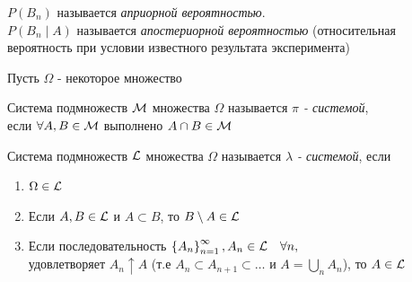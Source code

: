 \begin{definition}
	$P(B_n)$ называется \emph{априорной вероятностью}.\\
	$P(B_n \mid A)$ называется \emph{апостериорной вероятностью} (относительная вероятность при условии известного результата эксперимента)
\end{definition}


Пусть $\Omega$ - некоторое множество

\begin{definition}
	Система подмножеств $\mathcal{M}$ множества $\Omega$ называется \emph{$\pi$ - системой}, \\
	если $\forall A, B \in \mathcal{M}$ выполнено $A \cap B \in \mathcal{M}$
\end{definition}

\begin{definition}
	Система подмножеств $\mathcal{L}$ множества $\Omega$ называется \emph{$\lambda$ - системой}, если
	\begin{enumerate}
		\item 
			$\Omega \in \mathcal{L}$

		\item 
			Если $A, B \in \mathcal{L}$ и $A \subset B$, то $B \setminus A \in \mathcal{L}$

		\item 
			Если последовательность $\left\{ A_n \right\}_{n=1}^{\infty}, A_n \in \mathcal{L} \quad \forall n,$ \\
			удовлетворяет $A_n \uparrow A$ (т.е $A_n \subset A_{n + 1} \subset \ldots$  
			и $A = \bigcup\limits_n A_n$), то $A \in \mathcal{L}$
	\end{enumerate}
\end{definition}

